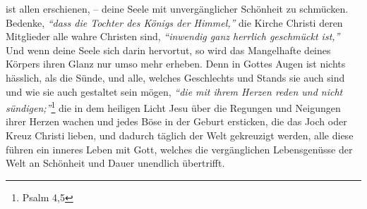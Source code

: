 ist allen erschienen, -- deine Seele mit unvergänglicher Schönheit zu schmücken.
Bedenke, \textit{"`dass die Tochter des Königs der Himmel,"'} die Kirche Christi
 deren
 Mitglieder alle wahre
Christen
sind, \textit{"`inwendig ganz herrlich geschmückt ist,"'}
Und wenn deine Seele sich darin hervortut, so wird das Mangelhafte deines
Körpers ihren Glanz nur umso mehr erheben. Denn in Gottes Augen ist nichts
hässlich, als die Sünde, und alle, welches Geschlechts und Stands
sie auch
sind und wie sie auch gestaltet sein mögen,
\textit{"`die mit ihrem Herzen reden und
nicht sündigen;"'}\footnote{Psalm 4,5}
die in dem heiligen Licht Jesu über die
Regungen und Neigungen ihrer Herzen wachen und jedes Böse in der Geburt
ersticken, die das Joch oder Kreuz Christi  lieben, und dadurch
täglich der Welt
gekreuzigt werden, alle diese führen ein inneres Leben
mit
Gott, welches die
vergänglichen Lebensgenüsse der Welt an Schönheit und Dauer unendlich
übertrifft.

